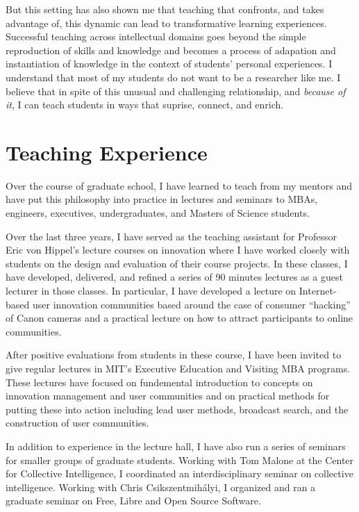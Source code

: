 \documentclass[10pt]{memoir}
\begin{document}
But this setting has also shown me that teaching that confronts, and
takes advantage of, this dynamic can lead to transformative learning
experiences. Successful teaching across intellectual domains goes
beyond the simple reproduction of skills and knowledge and becomes a
process of adapation and instantiation of knowledge in the context of
students' personal experiences. I understand that most of my students
do not want to be a researcher like me. I believe that in spite of
this unusual and challenging relationship, and \emph{because of it}, I
can teach students in ways that suprise, connect, and enrich.

\section{Teaching Experience}

Over the course of graduate school, I have learned to teach from my
mentors and have put this philosophy into practice in lectures and
seminars to MBAs, engineers, executives, undergraduates, and Masters
of Science students.

Over the last three years, I have served as the teaching assistant for
Professor Eric von Hippel's lecture courses on innovation where I have
worked closely with students on the design and evaluation of their
course projects. In these classes, I have developed, delivered, and
refined a series of 90 minutes lectures as a guest lecturer in those
classes. In particular, I have developed a lecture on Internet-based
user innovation communities based around the case of consumer
``hacking'' of Canon cameras and a practical lecture on how to attract
participants to online communities.

After positive evaluations from students in these course, I have been
invited to give regular lectures in MIT's Executive Education and
Visiting MBA programs. These lectures have focused on fundemental
introduction to concepts on innovation management and user communities
and on practical methods for putting these into action including lead
user methods, broadcast search, and the construction of user
communities.

In addition to experience in the lecture hall, I have also run a
series of seminars for smaller groups of graduate students. Working
with Tom Malone at the Center for Collective Intelligence, I
coordinated an interdisciplinary seminar on collective
intelligence. Working with Chris Csikszentmihályi, I organized and ran
a graduate seminar on Free, Libre and Open Source
Software.
\end{document}

